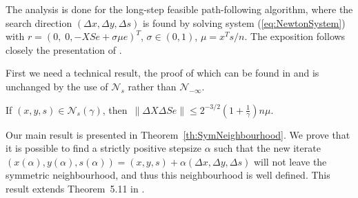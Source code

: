 
The analysis is done for the long-step feasible path-following 
algorithm, where the search direction $(\Delta x, \Delta y, \Delta s)$ 
is found by solving system (\ref{eq:NewtonSystem}) with 
$r=(0,\; 0,-XSe+\sigma\mu e)^T$, $\sigma\in(0,1)$, $\mu=x^Ts/n$.
%
The exposition follows closely the presentation of 
\cite[Chapter~5]{ipm:Wright97}. 

First we need a technical result, the proof of which can be found 
in \cite[Lemma~5.10]{ipm:Wright97} and is unchanged by the use 
of $\mathcal{N}_s$ rather than $\mathcal{N}_{-\infty}$.
%
\begin{lemma} \label{Wright:5.10}
If $(x,y,s)\in \mathcal{N}_s(\gamma)$, then\,
\(
  \|\Delta X\Delta Se\| \le 2^{-3/2}\left( 1+ \displaystyle{\frac{1}{\gamma}} \right)n\mu.
\)
\end{lemma}

Our main result is presented in Theorem~\ref{th:SymNeighbourhood}. 
We prove that it is possible to find a strictly positive stepsize 
$\alpha$ such that the new iterate 
$(x(\alpha),y(\alpha),s(\alpha))=(x,y,s)+\alpha(\Delta x,\Delta y,\Delta s)$
will not leave the symmetric neighbourhood, and thus this 
neighbourhood is well defined. This result extends 
Theorem~5.11 in \cite{ipm:Wright97}.

